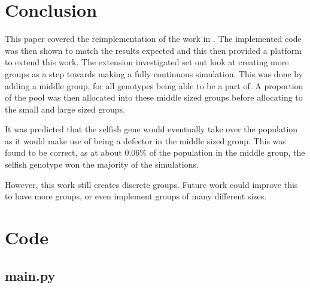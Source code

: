\documentclass[11pt]{ecsarticle}
\begin{document}
\section{Conclusion}\label{sc:conclusion}

This paper covered the reimplementation of the work in \cite{powers2007individual}. 
The implemented code was then shown to match the results expected and this then provided a platform to extend this work. 
The extension investigated set out look at creating more groups as a step towards making a fully continuous simulation.
This was done by adding a middle group, for all genotypes being able to be a part of. 
A proportion of the pool was then allocated into these middle sized groups before allocating to the small and large sized groups.

It was predicted that the selfish gene would eventually take over the population as it would make use of being a defector in the middle sized group. 
This was found to be correct, as at about 0.06\% of the population in the middle group, the selfish genotype won the majority of the simulations.

However, this work still creates discrete groups. 
Future work could improve this to have more groups, or even implement groups of many different sizes.




 


 \clearpage
 \section{Code}
 \lstset{language=Python} 
 \subsection{main.py}
 
\end{document}
